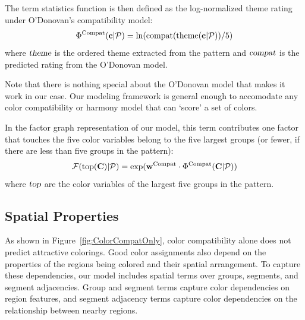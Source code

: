 The term statistics function is then defined as the log-normalized theme rating under O'Donovan's compatibility model:
\begin{equation*}
\Phi^{\textrm{Compat}}(\mathbf{c}| \mathcal{P}) = \ln(\textrm{compat}(\textrm{theme}(\mathbf{c}| \mathcal{P}))/5)
\end{equation*}
where $\textsl{theme}$ is the ordered theme extracted from the pattern and $\textsl{compat}$ is the predicted rating from the O'Donovan model.

Note that there is nothing special about the O'Donovan model that makes it work in our case. Our modeling framework is general enough to accomodate any color compatibility or harmony model that can `score' a set of colors.

In the factor graph representation of our model, this term contributes one factor that touches the five color variables belong to the five largest groups (or fewer, if there are less than five groups in the pattern):
\begin{equation*}
\mathcal{F}(\textrm{top}(\mathbf{C}) | \mathcal{P}) = \exp(\mathbf{w}^{\textrm{Compat}} \cdot \Phi^{\textrm{Compat}}(\mathbf{C} | \mathcal{P}))
\end{equation*}
where $\textsl{top}$ are the color variables of the largest five groups in the pattern.


\subsection{Spatial Properties}
\label{sec:spatialCompat}

As shown in Figure~\ref{fig:ColorCompatOnly}, color compatibility alone does not predict attractive colorings. Good color assignments also depend on the properties of the regions being colored and their spatial arrangement. To capture these dependencies, our model includes spatial terms over groups, segments, and segment adjacencies. Group and segment terms capture color dependencies on region features, and segment adjacency terms capture color dependencies on the relationship between nearby regions.

